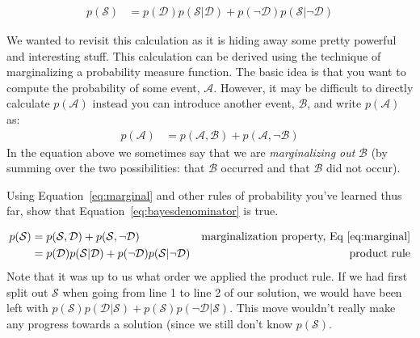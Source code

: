 \documentclass[assignment01_Solutions]{subfiles}
\begin{document}
\begin{align}
p(\mathcal{S}) &= p(\mathcal{D}) p(\mathcal{S}|\mathcal{D}) + p(\neg \mathcal{D}) p(\mathcal{S} | \neg \mathcal{D})
\end{align}

We wanted to revisit this calculation as it is hiding away some pretty powerful and interesting stuff.  This calculation can be derived using the technique of marginalizing a probability measure function.  The basic idea is that you want to compute the probability of some event, $\mathcal{A}$.  However, it may be difficult to directly calculate $p(\mathcal{A})$ instead you can introduce another event, $\mathcal{B}$, and write $p(\mathcal{A})$ as:
\begin{align}
p(\mathcal{A}) &= p(\mathcal{A}, \mathcal{B}) + p(\mathcal{A}, \neg \mathcal{B}) \label{eq:marginal}
\end{align}
In the equation above we sometimes say that we are \emph{marginalizing out} $\mathcal{B}$ (by summing over the two possibilities: that $\mathcal{B}$ occurred and that $\mathcal{B}$ did not occur).

\begin{exercise}[(15 minutes)]
Using Equation~\ref{eq:marginal} and other rules of probability you've learned thus far, show that Equation~\ref{eq:bayesdenominator} is true.

\begin{boxedsolution}
\begin{align}
p(\mathcal{S}) &= p(\mathcal{S}, \mathcal{D}) + p(\mathcal{S}, \neg \mathcal{D}) & \mbox{marginalization property, Eq~\ref{eq:marginal}} \nonumber \\
&= p(\mathcal{D})p(\mathcal{S}|\mathcal{D}) + p(\neg \mathcal{D}) p(\mathcal{S} | \neg \mathcal{D})& \mbox{product rule} \nonumber
\end{align}
Note that it was up to us what order we applied the product rule.  If we had first split out $\mathcal{S}$ when going from line 1 to line 2 of our solution, we would have been left with $p(\mathcal{S})p(\mathcal{D}|\mathcal{S}) + p(\mathcal{S}) p(\neg \mathcal{D} | \mathcal{S})$.  This move wouldn't really make any progress towards a solution (since we still don't know $p(\mathcal{S})$.

\end{boxedsolution}
\end{exercise}
\end{document}

